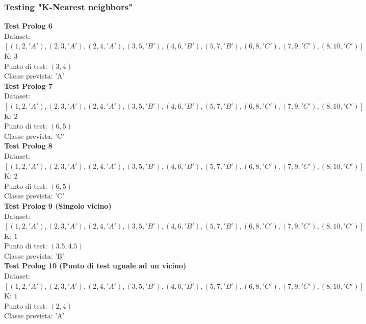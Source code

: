 \documentclass[11pt]{article}
\theoremstyle{definition}
\begin{document}
\subsubsection{Testing "K-Nearest neighbors"}
\textbf{Test Prolog 6}\\
Dataset: $[(1, 2, 'A'), (2, 3, 'A'), (2, 4, 'A'), (3, 5, 'B'), (4, 6, 'B'), (5, 7, 'B'), (6, 8, 'C'), (7, 9, 'C'), (8, 10, 'C')]$\\
K: $3$\\
Punto di test: $(3, 4)$\\
Classe prevista: 'A'\\
\newline
\textbf{Test Prolog 7}\\
Dataset: $[(1, 2, 'A'), (2, 3, 'A'), (2, 4, 'A'), (3, 5, 'B'), (4, 6, 'B'), (5, 7, 'B'), (6, 8, 'C'), (7, 9, 'C'), (8, 10, 'C')]$\\
K: $2$\\
Punto di test: $(6, 5)$\\
Classe prevista: 'C'\\
\newline
\textbf{Test Prolog 8}\\
Dataset: $[(1, 2, 'A'), (2, 3, 'A'), (2, 4, 'A'), (3, 5, 'B'), (4, 6, 'B'), (5, 7, 'B'), (6, 8, 'C'), (7, 9, 'C'), (8, 10, 'C')]$\\
K: $2$\\
Punto di test: $(6, 5)$\\
Classe prevista: 'C'\\
\newline
\textbf{Test Prolog 9 (Singolo vicino)}\\
Dataset: $[(1, 2, 'A'), (2, 3, 'A'), (2, 4, 'A'), (3, 5, 'B'), (4, 6, 'B'), (5, 7, 'B'), (6, 8, 'C'), (7, 9, 'C'), (8, 10, 'C')]$\\
K: $1$\\
Punto di test: $(3.5, 4.5)$\\
Classe prevista: 'B'\\
\newline
\textbf{Test Prolog 10 (Punto di test uguale ad un vicino)}\\
Dataset: $[(1, 2, 'A'), (2, 3, 'A'), (2, 4, 'A'), (3, 5, 'B'), (4, 6, 'B'), (5, 7, 'B'), (6, 8, 'C'), (7, 9, 'C'), (8, 10, 'C')]$\\
K: $1$\\
Punto di test: $(2, 4)$\\
Classe prevista: 'A'
\end{document}
